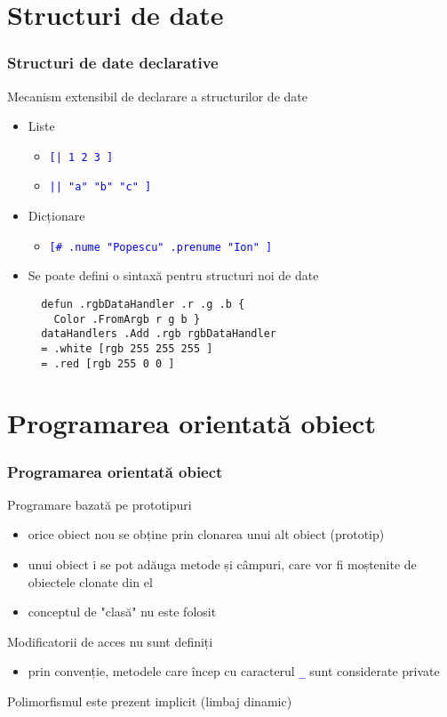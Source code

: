 \documentclass{beamer}
\renewcommand{\c}[1]{\textcolor{blue}{\texttt{#1}}}
\begin{document}
\section{Structuri de date}
\begin{frame}[containsverbatim]
  \frametitle{Structuri de date declarative}
  Mecanism extensibil de declarare a structurilor de date
  \begin{itemize}
    \item Liste
      \begin{itemize}
        \item \c{[| 1 2 3 ]}
        \item \c{|| "a" "b" "c" ]}
      \end{itemize}
    \item Dicționare
      \begin{itemize}
        \item \c{[\# .nume "Popescu" .prenume "Ion" ]}
      \end{itemize}
    \item Se poate defini o sintaxă pentru structuri noi de date
      \color{blue}
      \begin{verbatim}
  defun .rgbDataHandler .r .g .b {
    Color .FromArgb r g b }
  dataHandlers .Add .rgb rgbDataHandler
  = .white [rgb 255 255 255 ]
  = .red [rgb 255 0 0 ]
      \end{verbatim}
  \end{itemize}
\end{frame}

\section{Programarea orientată obiect}
\begin{frame}
  \frametitle{Programarea orientată obiect}
  Programare bazată pe prototipuri
  \begin{itemize}
    \item orice obiect nou se obține prin clonarea unui alt obiect (prototip)
    \item unui obiect i se pot adăuga metode și câmpuri, care vor fi moștenite de obiectele clonate din el
    \item conceptul de "clasă" nu este folosit
  \end{itemize}
  \vskip8pt
  Modificatorii de acces nu sunt definiți
  \begin{itemize}
    \item prin convenție, metodele care încep cu caracterul \c{\_} sunt considerate private
  \end{itemize}
  \vskip8pt
  Polimorfismul este prezent implicit (limbaj dinamic)
\end{frame}
\end{document}
